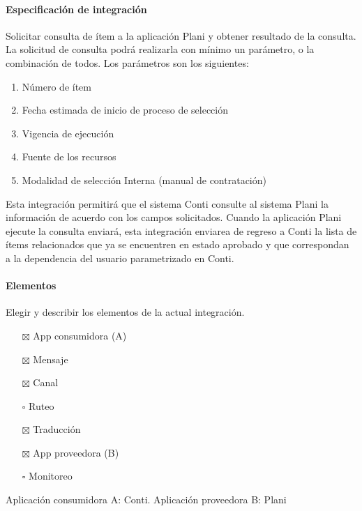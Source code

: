 \documentclass[
  paper=a4,
  ,captions=tableheading
]{scrartcl}
\providecommand{\tightlist}{%
  \setlength{\itemsep}{0pt}\setlength{\parskip}{0pt}}
\begin{document}
\paragraph{Especificación de
integración}\label{sec:especificaciuxf3n-de-integraciuxf3n-1}

Solicitar consulta de ítem a la aplicación Plani y obtener resultado de
la consulta. La solicitud de consulta podrá realizarla con mínimo un
parámetro, o la combinación de todos. Los parámetros son los siguientes:

\begin{enumerate}
\def\labelenumi{\arabic{enumi}.}
\tightlist
\item
  Número de ítem
\item
  Fecha estimada de inicio de proceso de selección
\item
  Vigencia de ejecución
\item
  Fuente de los recursos
\item
  Modalidad de selección Interna (manual de contratación)
\end{enumerate}

Esta integración permitirá que el sistema Conti consulte al sistema
Plani la información de acuerdo con los campos solicitados. Cuando la
aplicación Plani ejecute la consulta enviará, esta integración enviarea
de regreso a Conti la lista de ítems relacionados que ya se encuentren
en estado aprobado y que correspondan a la dependencia del usuario
parametrizado en Conti.

\paragraph{Elementos}\label{sec:elementos-1}

Elegir y describir los elementos de la actual integración.

\begin{itemize}
\tightlist
\item[$\boxtimes$]
  App consumidora (A)
\item[$\boxtimes$]
  Mensaje
\item[$\boxtimes$]
  Canal
\item[$\square$]
  Ruteo
\item[$\boxtimes$]
  Traducción
\item[$\boxtimes$]
  App proveedora (B)
\item[$\square$]
  Monitoreo
\end{itemize}

Aplicación consumidora A: Conti. Aplicación proveedora B: Plani
\end{document}

